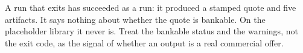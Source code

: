 \begin{caution}
A run that exits  has succeeded as a run: it produced a stamped quote and five artifacts. It says nothing about whether the quote is bankable. On the placeholder library it never is. Treat the bankable status and the warnings, not the exit code, as the signal of whether an output is a real commercial offer.
\end{caution}
